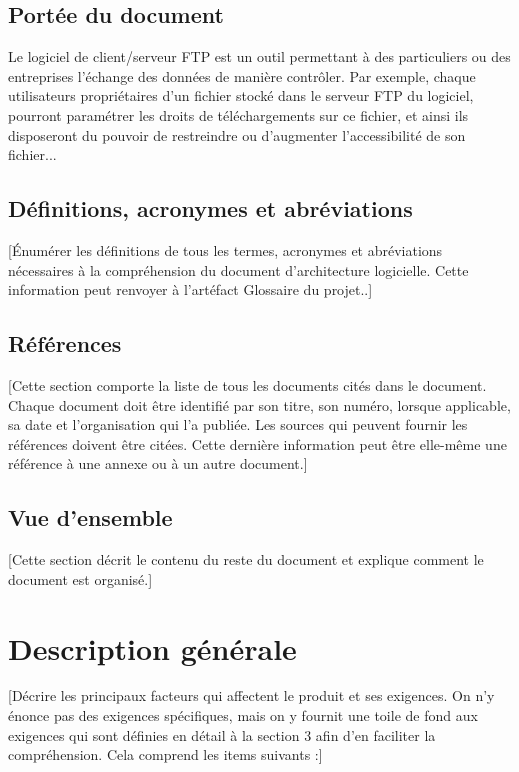 \documentclass[10pt,a4paper]{report}
\begin{document}
\subsection{Portée du document}
Le logiciel de client/serveur FTP est un outil permettant à des particuliers ou des entreprises l'échange des données de manière contrôler. Par exemple, chaque utilisateurs propriétaires d'un fichier stocké dans le serveur FTP du logiciel, pourront paramétrer les droits de téléchargements sur ce fichier, et ainsi ils disposeront du pouvoir de restreindre ou d'augmenter l'accessibilité de son fichier...

\subsection{Définitions, acronymes et abréviations}
[Énumérer les définitions de tous les termes, acronymes et abréviations nécessaires à la compréhension du document d’architecture logicielle. Cette information peut renvoyer à l’artéfact Glossaire du projet..]

\subsection{Références}
 [Cette section comporte la liste de tous les documents cités dans le document. Chaque document doit être identifié par son titre, son numéro, lorsque applicable, sa date et l’organisation qui l’a publiée. Les sources qui peuvent fournir les références doivent être citées. Cette dernière information peut être elle-même une référence à une annexe ou à un autre document.]
 
\subsection{Vue d’ensemble}
[Cette section décrit le contenu du reste du document  et explique comment le document est organisé.]


\section{Description générale}
[Décrire les principaux facteurs qui affectent le produit et ses exigences. On n’y énonce pas des exigences spécifiques, mais on y fournit une toile de fond aux exigences qui sont définies en détail à la section 3 afin d’en faciliter la compréhension. Cela comprend les items suivants :]
\end{document}
